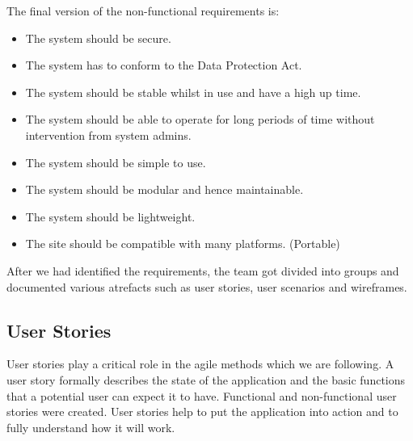 \documentclass{l3proj}
\begin{document}
The final version of the non-functional requirements is:

\begin{itemize}

\item The system should be secure.

\item The system has to conform to the Data Protection Act.

\item The system should be stable whilst in use and have a high up time.

\item The system should be able to operate for long periods of time without intervention from system admins.

\item The system should be simple to use.

\item The system should be modular and hence maintainable.

\item The system should be lightweight.

\item The site should be compatible with many platforms. (Portable)

\end{itemize}

After we had identified the requirements, the team got divided into groups and documented various atrefacts such as user stories, user scenarios and wireframes.

\subsection{User Stories}
\label{user_stories}

User stories \cite{UserStories} play a critical role in the agile methods which we are following. A user story formally describes the state of the application and the basic functions that a potential user can expect it to have. Functional and non-functional user stories were created. User stories help to put the application into action and to fully understand how it will work.
\end{document}
